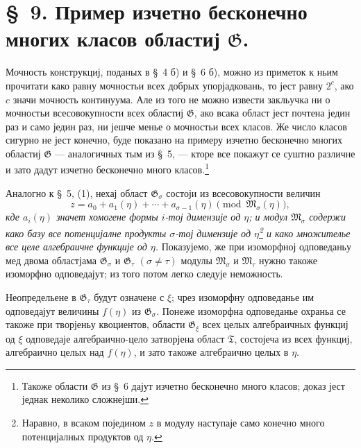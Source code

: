 ﻿\documentclass[11pt]{article}
\begin{document}
\section*{\S\ 9. Пример изчетно бесконечно многих класов областиј $\mathfrak G$.}

Мочность конструкциј, поданых в \S\ 4 б) и \S\ 6 б), можно из приметок к ньим
прочитати како равну мочностьи всех добрых упорјадковань, то јест равну $2^c$,
ако $c$ значи мочность континуума. Але из того не можно извести закльучка ни о
мочностьи всесовокупности всех областиј $\mathfrak G$, ако всака област јест
почтена једин раз и само једин раз, ни јешче менье о мочностьи всех класов. Же
число класов сигурно не јест конечно, буде показано на примеру изчетно
бесконечно многих областиј $\mathfrak G$ --- аналогичных тым из \S\ 5, ---
кторе все покажут се суштно различне и зато дадут изчетно бесконечно много
класов.\footnote{Такоже области $\mathfrak G$ из \S\ 6 дајут изчетно
бесконечно много класов; доказ јест једнак неколико сложнејши.}

Аналогно к \S\ 5, (1), нехај област $\mathfrak G_\sigma$ состоји из
всесовокупности величин
\begin{equation}
 z=a_0+a_1(\eta)+\cdots+a_{\sigma-1}(\eta)
 \pmod{\mathfrak M_\sigma(\eta)},
\tag{1}
\end{equation}
{\itshape кде $a_i(\eta)$ значет хомогене формы $i$-тој димензије од $\eta$;
и модул $\mathfrak M_\sigma$ содержи како базу все потенцијалне продукты
$\sigma$-тој димензије од $\eta$\footnote{Наравно, в всаком поједином $z$ в
модулу наступаје само конечно много потенцијалных продуктов од $\eta$.} и
како множителье все целе алгебраичне функције од $\eta$.} Показујемо, же при
изоморфној одповеданьу мед двома областјама $\mathfrak G_\sigma$ и
$\mathfrak G_\tau$ $(\sigma\ne\tau)$ модулы $\mathfrak M_\sigma$ и
$\mathfrak M_\tau$ нужно такоже изоморфно одповедајут; из того потом легко
следује неможность.

Неопредельене в $\mathfrak G_\tau$ будут означене с $\xi$; чрез изоморфну
одповеданье им одповедајут величины $f(\eta)$ из $\mathfrak G_\sigma$. Понеже
изоморфна одповеданье охраньа се такоже при творјеньу квоциентов, области
$\mathfrak G_\xi$ всех целых алгебраичных функциј од $\xi$ одповедаје
алгебраично-цело затворјена област $\mathfrak T$, состојеча из всех функциј,
алгебраично целых над $f(\eta)$, и зато такоже алгебраично целых в $\eta$.
\end{document}

